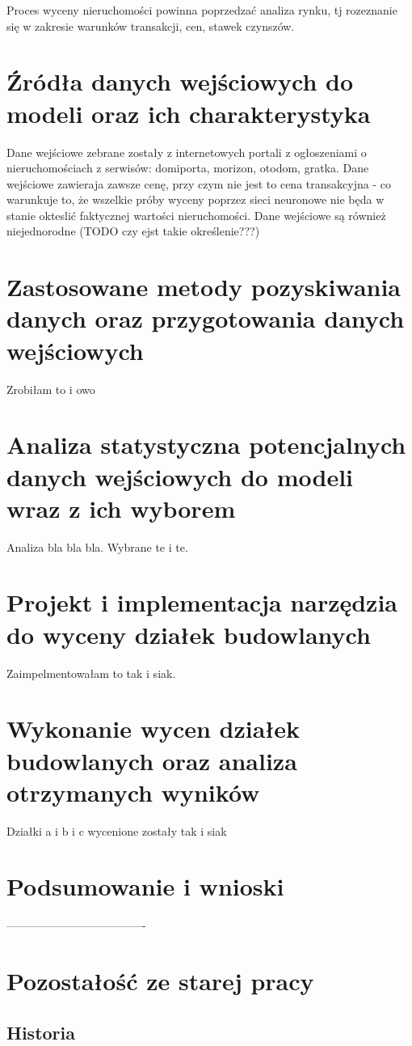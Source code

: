 \documentclass[a4paper,12pt,twoside,openany]{report}
\begin{document}
Proces wyceny nieruchomości powinna poprzedzać analiza rynku, tj rozeznanie się w zakresie warunków transakcji, cen, stawek czynszów.


\chapter{Źródła danych wejściowych do modeli oraz ich charakterystyka}
Dane wejściowe zebrane zostały  z internetowych portali z ogłoszeniami o nieruchomościach z serwisów: domiporta, morizon, otodom, gratka.
Dane wejściowe zawieraja zawsze cenę, przy czym nie jest to cena transakcyjna - co warunkuje to, że wszelkie próby wyceny poprzez sieci neuronowe nie będa w stanie okteslić faktycznej wartości nieruchomości.
Dane wejściowe są również niejednorodne (TODO czy ejst takie określenie???)

\chapter{Zastosowane metody pozyskiwania danych oraz przygotowania danych wejściowych}
Zrobiłam to i owo
\chapter{Analiza statystyczna potencjalnych danych wejściowych do modeli wraz z ich wyborem}
Analiza bla bla bla.
Wybrane te i te.
\chapter{Projekt i implementacja narzędzia do wyceny działek budowlanych}
Zaimpelmentowałam to tak i siak.
\chapter{Wykonanie wycen działek budowlanych oraz analiza otrzymanych wyników}
Działki a i b i c wycenione zostały tak i siak
\chapter{Podsumowanie i wnioski}

-------------------------------------
\chapter{Pozostałość ze starej pracy}

\section{Historia}
\end{document}
